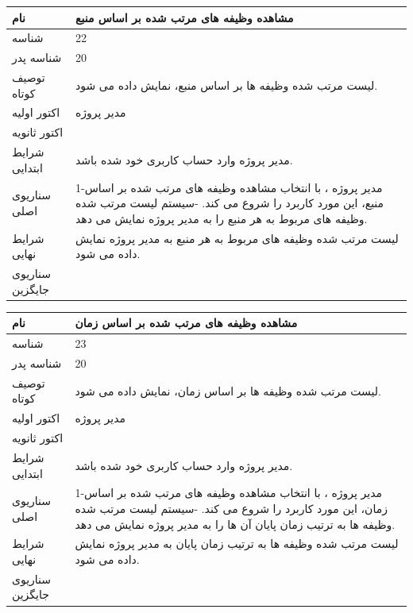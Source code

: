 \documentclass{article}
\begin{document}
\vspace{2cm}

\begin{tabular}{|p{2cm}|p{10cm}|}
\hline
نام
&
مشاهده وظیفه های مرتب شده بر اساس منبع
\\
\hline
شناسه
&
22
\\
\hline
شناسه پدر
&
20
\\
\hline
توصیف کوتاه  
&
لیست مرتب شده وظیفه ها بر اساس منبع، نمایش داده می شود.
\\
\hline
اکتور اولیه
&
مدیر پروژه
\\
\hline
اکتور ثانویه
&

\\
\hline
شرایط ابتدایی
&
مدیر پروژه وارد حساب کاربری خود شده باشد. 
\\
\hline
سناریوی اصلی
&
1-مدیر پروژه ، با انتخاب مشاهده وظیفه های مرتب شده بر اساس منبع، این مورد کاربرد را شروع می کند.
\newline
2-سیستم لیست مرتب شده وظیفه های مربوط به هر منبع را به مدیر پروژه نمایش می دهد.
\\
\hline
شرایط نهایی
&
لیست مرتب شده وظیفه های مربوط به هر منبع به مدیر پروژه نمایش داده می شود.
\\
\hline
سناریوی جایگزین
&

\\
\hline
\end{tabular}

\vspace{2cm}

\begin{tabular}{|p{2cm}|p{10cm}|}
\hline
نام
&
مشاهده وظیفه های مرتب شده بر اساس زمان\\
\hline
شناسه
&
23
\\
\hline
شناسه پدر
&
20
\\
\hline
توصیف کوتاه  
&
لیست مرتب شده وظیفه ها بر اساس زمان، نمایش داده می شود.
\\
\hline
اکتور اولیه
&
مدیر پروژه
\\
\hline
اکتور ثانویه
&

\\
\hline
شرایط ابتدایی
&
مدیر پروژه وارد حساب کاربری خود شده باشد. 
\\
\hline
سناریوی اصلی
&
1-مدیر پروژه ، با انتخاب مشاهده وظیفه های مرتب شده بر اساس زمان، این مورد کاربرد را شروع می کند.
\newline
2-سیستم لیست مرتب شده وظیفه ها به ترتیب زمان پایان  آن ها  را به مدیر پروژه نمایش می دهد.
\\
\hline
شرایط نهایی
&
لیست مرتب شده وظیفه ها به ترتیب زمان پایان به مدیر پروژه نمایش داده می شود.
\\
\hline
سناریوی جایگزین
&

\\
\hline
\end{tabular}
\end{document}
